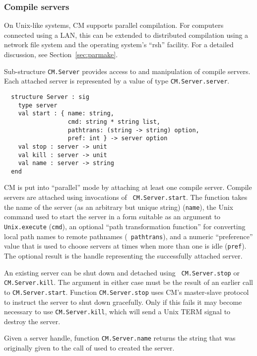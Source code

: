 \documentclass[titlepage,letterpaper]{article}
\begin{document}
\subsubsection{Compile servers}

On Unix-like systems, CM supports parallel compilation.  For computers
connected using a LAN, this can be extended to distributed compilation
using a network file system and the operating system's ``rsh''
facility.  For a detailed discussion, see Section~\ref{sec:parmake}.

Sub-structure {\tt CM.Server} provides access to and manipulation of
compile servers.  Each attached server is represented by a value of
type {\tt CM.Server.server}.

\begin{verbatim}
  structure Server : sig
    type server
    val start : { name: string,
                  cmd: string * string list,
                  pathtrans: (string -> string) option,
                  pref: int } -> server option
    val stop : server -> unit
    val kill : server -> unit
    val name : server -> string
  end
\end{verbatim}

CM is put into ``parallel'' mode by attaching at least one compile
server.  Compile servers are attached using invocations of {\tt
CM.Server.start}.  The function takes the name of the server (as an
arbitrary but unique string) ({\tt name}), the Unix command used to
start the server in a form suitable as an argument to {\tt
Unix.execute} ({\tt cmd}), an optional ``path transformation
function'' for converting local path names to remote pathnames ({\tt
pathtrans}), and a numeric ``preference'' value that is used to choose
servers at times when more than one is idle ({\tt pref}).  The
optional result is the handle representing the successfully attached
server.

An existing server can be shut down and detached using {\tt
CM.Server.stop} or {\tt CM.Server.kill}.  The argument in either case
must be the result of an earlier call to {\tt CM.Server.start}.
Function {\tt CM.Server.stop} uses CM's master-slave protocol to
instruct the server to shut down gracefully.  Only if this fails it
may become necessary to use {\tt CM.Server.kill}, which will send a
Unix TERM signal to destroy the server.

Given a server handle, function {\tt CM.Server.name} returns the
string that was originally given to the call of used to created the server.
\end{document}
